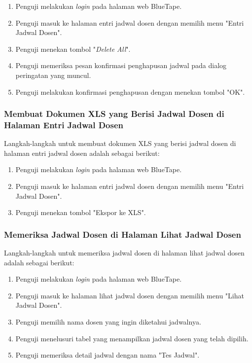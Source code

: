 \begin{enumerate}
    \item Penguji melakukan \textit{login} pada halaman web BlueTape.
    \item Penguji masuk ke halaman entri jadwal dosen dengan memilih menu "Entri Jadwal Dosen".
    \item Penguji menekan tombol "\textit{Delete All}".
    \item Penguji memeriksa pesan konfirmasi penghapusan jadwal pada dialog peringatan yang muncul.
    \item Penguji melakukan konfirmasi penghapusan dengan menekan tombol "OK".
\end{enumerate}

\subsubsection{Membuat Dokumen XLS yang Berisi Jadwal Dosen di Halaman Entri Jadwal Dosen}
\label{subsubsec:skenario_membuat_dokumen_xls_yang_berisi_jadwal_dosen_di_halaman_entri_jadwal_dosen}
Langkah-langkah untuk membuat dokumen XLS yang berisi jadwal dosen di halaman entri jadwal dosen adalah sebagai berikut:

\begin{enumerate}
    \item Penguji melakukan \textit{login} pada halaman web BlueTape.
    \item Penguji masuk ke halaman entri jadwal dosen dengan memilih menu "Entri Jadwal Dosen".
    \item Penguji menekan tombol "Ekspor ke XLS".
\end{enumerate}

\subsubsection{Memeriksa Jadwal Dosen di Halaman Lihat Jadwal Dosen}
\label{subsubsec:skenario_memeriksa_jadwal_dosen_di_halaman_lihat_jadwal_dosen}
Langkah-langkah untuk memeriksa jadwal dosen di halaman lihat jadwal dosen adalah sebagai berikut:

\begin{enumerate}
    \item Penguji melakukan \textit{login} pada halaman web BlueTape.
    \item Penguji masuk ke halaman lihat jadwal dosen dengan memilih menu "Lihat Jadwal Dosen".
    \item Penguji memilih nama dosen yang ingin diketahui jadwalnya.
    \item Penguji menelusuri tabel yang menampilkan jadwal dosen yang telah dipilih.
    \item Penguji memeriksa detail jadwal dengan nama "Tes Jadwal".
\end{enumerate}


